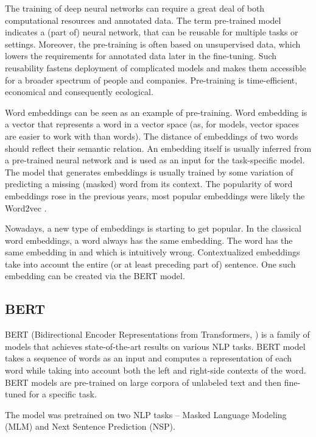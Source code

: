 The training of deep neural networks can require a great deal of both computational resources and annotated data. The term pre-trained model indicates a (part of) neural network, that can be reusable for multiple tasks or settings. Moreover, the pre-training is often based on unsupervised data, which lowers the requirements for annotated data later in the fine-tuning. Such reusability fastens deployment of complicated models and makes them accessible for a broader spectrum of people and companies. Pre-training is time-efficient, economical and consequently ecological.

Word embeddings can be seen as an example of pre-training. Word embedding is a vector that represents a word in a vector space (as, for models, vector spaces are easier to work with than words). The distance of embeddings of two words should reflect their semantic relation. An embedding itself is usually inferred from a pre-trained neural network and is used as an input for the task-specific model. The model that generates embeddings is usually trained by some variation of predicting a missing (masked) word from its context. The popularity of word embeddings rose in the previous years, most popular embeddings were likely the Word2vec \citep{mikolov2013word2vec}.  

Nowadays, a new type of embeddings is starting to get popular. In the classical word embeddings, a word always has the same embedding. The word  has the same embedding in  and  which is intuitively wrong. Contextualized embeddings take into account the entire (or at least preceding part of) sentence. One such embedding can be created via the BERT model.

\subsection{BERT}
\label{sec:bert}
BERT (Bidirectional Encoder Representations from Transformers, \citep{bert}) is a family of models that achieves state-of-the-art results on various NLP tasks. BERT model takes a sequence of words as an input and computes a representation of each word while taking into account both the left and right-side contexts of the word. BERT models are pre-trained on large corpora of unlabeled text and then fine-tuned for a specific task. 

The model was pretrained on two NLP tasks -- Masked Language Modeling (MLM) and Next Sentence Prediction (NSP). 

